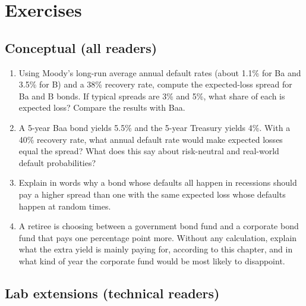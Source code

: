 \section*{Exercises}

\subsection*{Conceptual (all readers)}

\begin{enumerate}
  \item Using Moody's long-run average annual default rates (about 1.1\% for Ba and 3.5\% for B) and a 38\% recovery rate, compute the expected-loss spread for Ba and B bonds. If typical spreads are 3\% and 5\%, what share of each is expected loss? Compare the results with Baa.
  \item A 5-year Baa bond yields 5.5\% and the 5-year Treasury yields 4\%. With a 40\% recovery rate, what annual default rate would make expected losses equal the spread? What does this say about risk-neutral and real-world default probabilities?
  \item Explain in words why a bond whose defaults all happen in recessions should pay a higher spread than one with the same expected loss whose defaults happen at random times.
  \item A retiree is choosing between a government bond fund and a corporate bond fund that pays one percentage point more. Without any calculation, explain what the extra yield is mainly paying for, according to this chapter, and in what kind of year the corporate fund would be most likely to disappoint.
\end{enumerate}

\subsection*{Lab extensions (technical readers)}

